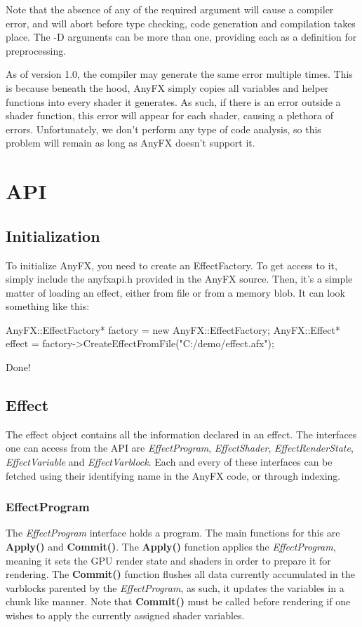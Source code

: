 \documentclass{article}
\begin{document}
Note that the absence of any of the required argument will cause a compiler error, and will abort before type checking, code generation and compilation takes place. The -D arguments can be more than one, providing each as a definition for preprocessing. 

As of version 1.0, the compiler may generate the same error multiple times. This is because beneath the hood, AnyFX simply copies all variables and helper functions into every shader it generates. As such, if there is an error outside a shader function, this error will appear for each shader, causing a plethora of errors. Unfortunately, we don't perform any type of code analysis, so this problem will remain as long as AnyFX doesn't support it.

\clearpage
\section{API}
\subsection{Initialization}
To initialize AnyFX, you need to create an EffectFactory. To get access to it, simply include the anyfxapi.h provided in the AnyFX source. Then, it's a simple matter of loading an effect, either from file or from a memory blob. It can look something like this:

\begin{CodeBox}
	AnyFX::EffectFactory* factory = new AnyFX::EffectFactory;
	AnyFX::Effect* effect = factory->CreateEffectFromFile("C:/demo/effect.afx");
\end{CodeBox}

Done!

\subsection{Effect}
The effect object contains all the information declared in an effect. The interfaces one can access from the API are \textit{EffectProgram}, \textit{EffectShader}, \textit{EffectRenderState}, \textit{EffectVariable} and \textit{EffectVarblock}. Each and every of these interfaces can be fetched using their identifying name in the AnyFX code, or through indexing.

\subsubsection{EffectProgram}
The \textit{EffectProgram} interface holds a program. The main functions for this are \textbf{Apply()} and \textbf{Commit()}. The \textbf{Apply()} function applies the \textit{EffectProgram}, meaning it sets the GPU render state and shaders in order to prepare it for rendering. The \textbf{Commit()} function flushes all data currently accumulated in the varblocks parented by the \textit{EffectProgram}, as such, it updates the variables in a chunk like manner. Note that \textbf{Commit()} must be called before rendering if one wishes to apply the currently assigned shader variables.
\end{document}
